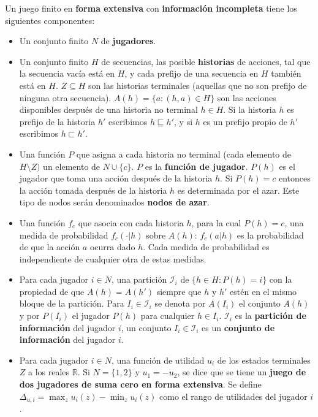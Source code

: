\begin{definition}
\label{def:informacion-incompleta}
Un juego finito en \textbf{forma extensiva} con \textbf{información incompleta} tiene los siguientes componentes:
\begin{itemize}
  \item Un conjunto finito $N$ de \textbf{jugadores}.
  \item Un conjunto finito $H$ de secuencias, las posible \textbf{historias} de acciones, tal que la secuencia vacía está en $H$, y cada prefijo de una secuencia en $H$ también está en $H$. $Z \subseteq H$ son las historias terminales (aquellas que no son prefijo de ninguna otra secuencia). $A(h) = \{ a : (h, a) \in H \}$ son las acciones disponibles después de una historia no terminal $h \in H$. Si la historia $h$ es prefijo de la historia $h'$ escribimos $h\sqsubseteq h'$, y si $h$ es un prefijo propio de $h'$ escribimos $h\sqsubset h'$.
  \item Una función $P$ que asigna a cada historia no terminal (cada elemento de $H \setminus Z)$ un elemento de $N \cup \{c \}$. $P$ es la \textbf{función de jugador}. $P(h)$ es el jugador que toma una acción después de la historia $h$. Si $P(h) = c$ entonces la acción tomada después de la historia $h$ es determinada por el azar. Este tipo de nodos serán denominados \textbf{nodos de azar}.
  \item Una función $f_c$ que asocia con cada historia $h$, para la cual $P(h) = c$, una medida de probabilidad $f_c(\cdot|h)$ sobre $A(h)$: $f_c(a|h)$ es la probabilidad de que la acción $a$ ocurra dado $h$.  Cada medida de probabilidad es independiente de cualquier otra de estas medidas.
  \item Para cada jugador $i \in N$, una partición $\mathcal{I}_i$ de $\{h \in H : P(h) = i\}$ con la propiedad de que $A(h) = A(h')$ siempre que $h$ y $h'$ estén en el mismo bloque de la partición. Para $I_i \in \mathcal{I}_i$ se denota por $A(I_i)$ el conjunto $A(h)$ y por $P(I_i)$ el jugador $P(h)$ para cualquier $h \in I_i$. $\mathcal{I}_i$ es la \textbf{partición de información} del jugador $i$, un conjunto $I_i \in \mathcal{I}_i$ es un \textbf{conjunto de información} del jugador $i$.
  \item Para cada jugador $i \in N$, una función de utilidad $u_i$ de los estados terminales $Z$ a los reales $\mathbb{R}$. Si $N = \{1,2\}$ y $u_1 = -u_2$, se dice que se tiene un \textbf{juego de dos jugadores de suma cero en forma extensiva}. Se define $\Delta_{u,i} = \max_z u_i(z) - \min_z u_i(z)$ como el rango de utilidades del jugador $i$.
\end{itemize}
\end{definition}


